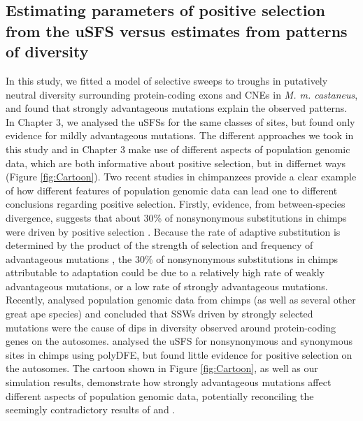 {\subsection{Estimating parameters of positive selection from the uSFS versus estimates from patterns of diversity}

	In this study, we fitted a model of selective sweeps to troughs in putatively neutral diversity surrounding protein-coding exons and CNEs in \textit{M. m. castaneus}, and found that strongly advantageous mutations explain the observed patterns. In Chapter 3, we analysed the uSFSs for the same classes of sites, but found only evidence for mildly advantageous mutations. The different approaches we took in this study and in Chapter 3 make use of different aspects of population genomic data, which are both informative about positive selection, but in differnet ways (Figure \ref{fig:Cartoon}). Two recent studies in chimpanzees provide a clear example of how different features of population genomic data can lead one to different conclusions regarding positive selection. Firstly, evidence, from between-species divergence, suggests that about 30\% of nonsynonymous substitutions in chimps were driven by positive selection \citep{RN215}. Because the rate of adaptive substitution is determined by the product of the strength of selection and frequency of advantageous mutations \citep{RN384}, the 30\% of nonsynonymous substitutions in chimps attributable to adaptation could be due to a relatively high rate of weakly advantageous mutations, or a low rate of strongly advantageous mutations. Recently, \cite{RN365} analysed population genomic data from chimps (as well as several other great ape species) and concluded that SSWs driven by strongly selected mutations were the cause of dips in diversity observed around protein-coding genes on the autosomes. \cite{RN354} analysed the uSFS for nonsynonymous and synonymous sites in chimps using polyDFE, but found little evidence for positive selection on the autosomes. The cartoon shown in Figure \ref{fig:Cartoon}, as well as our simulation results, demonstrate how strongly advantageous mutations affect different aspects of population genomic data, potentially reconciling the seemingly contradictory results of \cite{RN365} and \cite{RN354}. 

}

